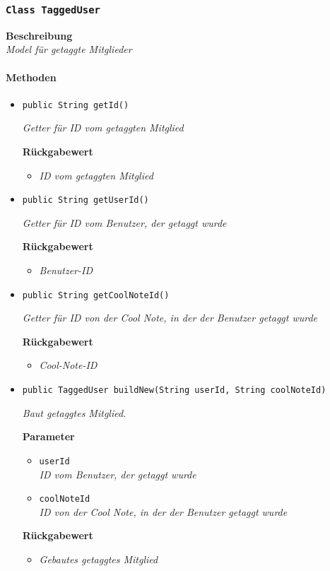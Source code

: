      \subsubsection{\texttt{Class TaggedUser}}
     \textbf{Beschreibung} \\
     \textit{Model für getaggte Mitglieder}
     \paragraph*{Methoden}
     \begin{itemize}
     	\item{\texttt{public String getId()}}
     	
     	\textit{Getter für ID vom getaggten Mitglied}
     	
     	\textbf{Rückgabewert}
     	\begin{itemize}
     		\item\textit{ID vom getaggten Mitglied}
     	\end{itemize}
     
     \item{\texttt{public String getUserId()}}
     	
     	\textit{Getter für ID vom Benutzer, der getaggt wurde}
     	
     	\textbf{Rückgabewert}
     	\begin{itemize}
     		\item\textit{Benutzer-ID}
     	\end{itemize}
     
     \item{\texttt{public String getCoolNoteId()}}
     	
     	\textit{Getter für ID von der Cool Note, in der der Benutzer getaggt wurde}
     	
     	\textbf{Rückgabewert}
     	\begin{itemize}
     		\item\textit{Cool-Note-ID}
     	\end{itemize}
     
     \item{\texttt{public TaggedUser buildNew(String userId, String coolNoteId)}}
     	
     	\textit{Baut getaggtes Mitglied.}
     	
     	\textbf{Parameter}
     	\begin{itemize}
     		\item\texttt{userId}\\
     		\textit{ID vom Benutzer, der getaggt wurde}
     		\item\texttt{coolNoteId}\\
     		\textit{ID von der Cool Note, in der der Benutzer getaggt wurde}
     	\end{itemize}
     
     	\textbf{Rückgabewert}
     	\begin{itemize}
     		\item\textit{Gebautes getaggtes Mitglied}
     	\end{itemize}
     \end{itemize}
